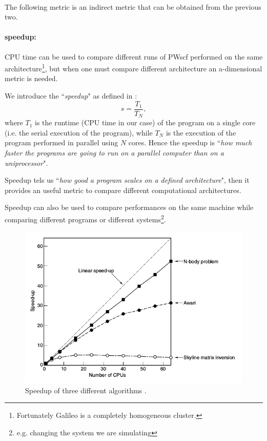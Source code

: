 \documentclass[a4paper,12pt]{article}
\begin{document}
~

The following metric is an indirect metric that can be obtained from the previous two.
\paragraph{speedup:}  CPU time can be used to compare different runs of PWscf performed on the same architecture\footnote{Fortunately Galileo is a completely homogeneous cluster.}, but when one must compare different architecture an a-dimensional metric is needed.

We introduce the ``\textit{speedup}" as defined in \cite{Tanenbaum} : 
\begin{equation}\label{eq:speedup}
	s = \frac{T_{1}}{T_{N}},
\end{equation}
where $T_{1}$ is the runtime (CPU time in our case) of the program on a single core (i.e. the serial execution of the program), while $T_{N}$ is the execution of the program performed in parallel using $N$ cores.
Hence the speedup is ``\textit{how much faster the programs are going to run on a parallel computer than on a
uniprocessor}"\cite[p.648]{Tanenbaum}.

Speedup tels us ``\textit{how good a program scales on a defined architecture}", then it provides an useful metric to compare different computational architectures.

Speedup can also be used to compare performances on the same machine while comparing different programs or different systems\footnote{e.g. changing the system we are simulating}.

\begin{figure}[hhh!]
\begin{center}
	\includegraphics[width=0.8\linewidth]{tanenbaum_speedup.png}	
	\caption{Speedup of three different algorithms \cite{Tanenbaum}.}
	\label{fig:TanenbaumSpeedup}
\end{center}
\end{figure}
\end{document}
